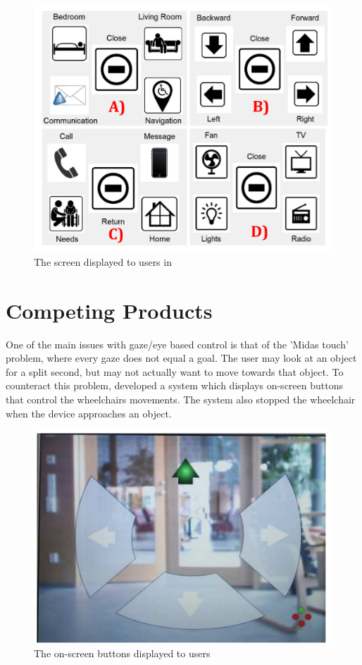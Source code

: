 \documentclass[12pt,a4paper]{report}
\begin{document}
\begin{figure}[h!]
	\begin{center}
		\includegraphics[scale=0.4]{Images/Literature/Eye_Tracker_Control.png}
		\caption{The screen displayed to users in \cite{H.Montenegro-Couto2018}}
	\end{center}
\end{figure}

\section{Competing Products}
One of the main issues with gaze/eye based control is that of the 'Midas touch' problem, where every gaze does not equal a goal. The user may look at an object for a split second, but may not actually want to move towards that object. To counteract this problem, \cite{Wastlund2010} developed a system which displays on-screen buttons that control the wheelchairs movements. The system also stopped the wheelchair when the device approaches an object.

\begin{figure}[h!]
	\begin{center}
		\includegraphics[scale=0.4]{Images/Literature/Wastlund_AR_Screen.png}
		\caption{The on-screen buttons displayed to users \citep{Wastlund2010}}
	\end{center}
\end{figure}
\end{document}
